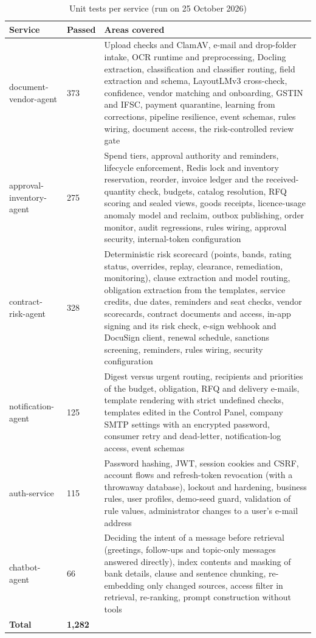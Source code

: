 \begin{table}[H]
\centering\tablestyle
\caption{Unit tests per service (run on 25 October 2026)}\label{tab:unit}
\begin{tabularx}{\textwidth}{|L{0.25\textwidth}|C{0.09\textwidth}|Y|}
\hline
\textbf{Service} & \textbf{Passed} & \textbf{Areas covered} \\ \hline
document-vendor-agent & 373 & Upload checks and ClamAV, e-mail and drop-folder intake, OCR runtime and preprocessing, Docling extraction, classification and classifier routing, field extraction and schema, LayoutLMv3 cross-check, confidence, vendor matching and onboarding, GSTIN and IFSC, payment quarantine, learning from corrections, pipeline resilience, event schemas, rules wiring, document access, the risk-controlled review gate \\ \hline
approval-inventory-agent & 275 & Spend tiers, approval authority and reminders, lifecycle enforcement, Redis lock and inventory reservation, reorder, invoice ledger and the received-quantity check, budgets, catalog resolution, RFQ scoring and sealed views, goods receipts, licence-usage anomaly model and reclaim, outbox publishing, order monitor, audit regressions, rules wiring, approval security, internal-token configuration \\ \hline
contract-risk-agent & 328 & Deterministic risk scorecard (points, bands, rating status, overrides, replay, clearance, remediation, monitoring), clause extraction and model routing, obligation extraction from the templates, service credits, due dates, reminders and seat checks, vendor scorecards, contract documents and access, in-app signing and its risk check, e-sign webhook and DocuSign client, renewal schedule, sanctions screening, reminders, rules wiring, security configuration \\ \hline
notification-agent & 125 & Digest versus urgent routing, recipients and priorities of the budget, obligation, RFQ and delivery e-mails, template rendering with strict undefined checks, templates edited in the Control Panel, company SMTP settings with an encrypted password, consumer retry and dead-letter, notification-log access, event schemas \\ \hline
auth-service & 115 & Password hashing, JWT, session cookies and CSRF, account flows and refresh-token revocation (with a throwaway database), lockout and hardening, business rules, user profiles, demo-seed guard, validation of rule values, administrator changes to a user's e-mail address \\ \hline
chatbot-agent & 66 & Deciding the intent of a message before retrieval (greetings, follow-ups and topic-only messages answered directly), index contents and masking of bank details, clause and sentence chunking, re-embedding only changed sources, access filter in retrieval, re-ranking, prompt construction without tools \\ \hline
\textbf{Total} & \textbf{1,282} & \\ \hline
\end{tabularx}
\end{table}

